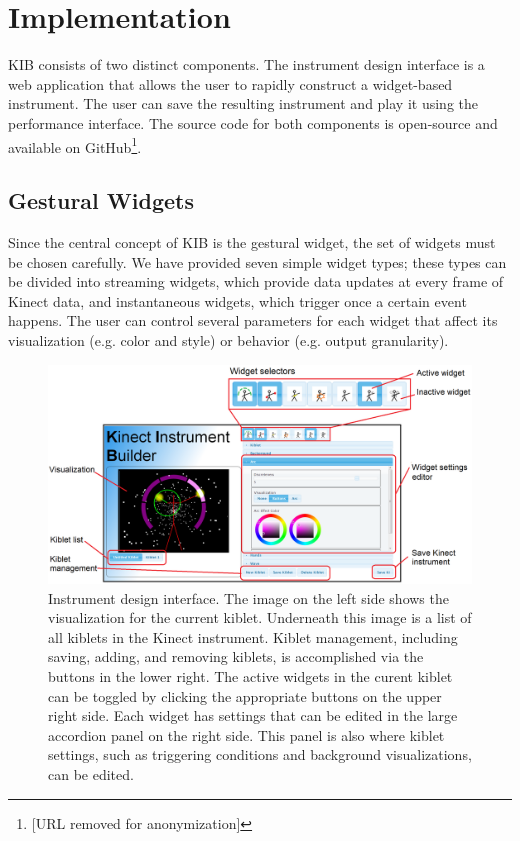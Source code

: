 \documentclass{nime-alternate}
\begin{document}
\section{Implementation}
KIB consists of two distinct components. The instrument design interface is a web
application that allows the user to rapidly construct a widget-based instrument. The user
can save the resulting instrument and play it using the performance interface. The source code
for both components is open-source and available on GitHub\footnote{[URL removed for anonymization]}.
\subsection{Gestural Widgets}
Since the central concept of KIB is the gestural widget, the set of widgets must be chosen
carefully. We have provided seven simple widget types; these types can be divided into streaming
widgets, which provide data updates at every frame of Kinect data, and instantaneous widgets,
which trigger once a certain event happens. The user can control several parameters for each widget
that affect its visualization (e.g. color and style) or behavior (e.g. output granularity).
\begin{figure}
	\centering
		\includegraphics[width=1\textwidth]{figures/kib.png}
	\caption{Instrument design interface. The image on the left side shows the visualization for the current kiblet. Underneath this image is a list of
    all kiblets in the Kinect instrument. Kiblet management, including saving, adding, and removing kiblets, is accomplished via the buttons in the lower right.
    The active widgets in the 
    curent kiblet can be toggled by clicking the appropriate buttons on the upper right side. Each widget has settings that can be edited in the large
    accordion panel on the right side. This panel is also where kiblet settings, such as triggering conditions and background visualizations, can be edited.}
	\label{fig:interface}
\end{figure}
\end{document}
